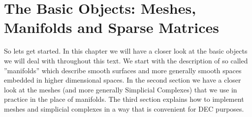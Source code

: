 \chapter{The Basic Objects: Meshes, Manifolds and Sparse Matrices}

So lets get started. In this chapter we will have a closer look at the basic objects we will deal with throughout this text.  We start with the description of so called ''manifolds'' which describe smooth surfaces and more generally smooth spaces embedded in higher dimensional spaces.
In the second section we have a closer look at the meshes (and more generally Simplicial Complexes) that we use in practice in the place of manifolds. The third section explains how to implement meshes and simplicial complexes in a way that is convenient for DEC purposes. 

